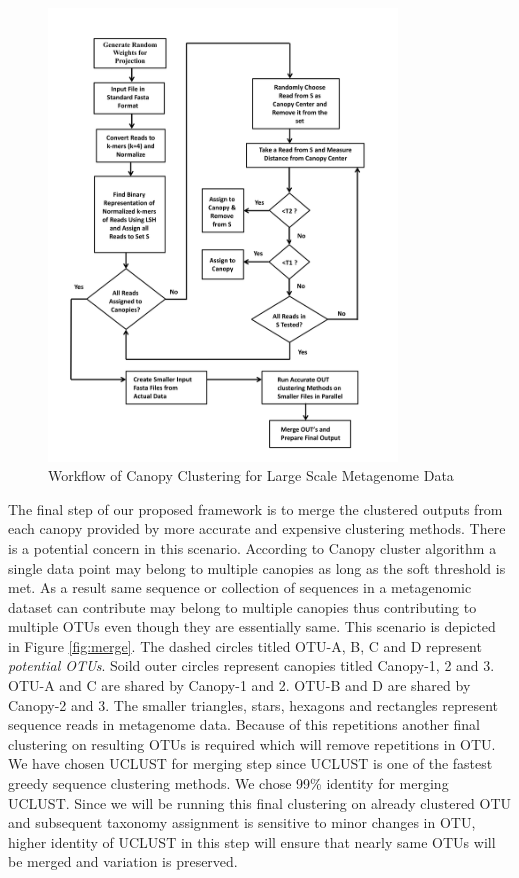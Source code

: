 \documentclass[10pt, conference, compsocconf]{IEEEtran}
\begin{document}
\begin{figure}
	\centering
	\includegraphics[width=\linewidth,height=12cm]{flowchart.png}	
	\caption{Workflow of Canopy Clustering for Large Scale Metagenome Data}
	\label{fig:flowchart}
\end{figure}

The final step of our proposed framework is to merge the clustered outputs from each canopy provided by more accurate and expensive clustering methods. There is a potential concern in this scenario. According to Canopy cluster algorithm a single data point may belong to multiple canopies as long as the soft threshold is met. As a result same sequence or collection of sequences in a metagenomic dataset can contribute may belong to multiple canopies thus contributing to multiple OTUs even though they are essentially same. This scenario is depicted in Figure \ref{fig:merge}. The dashed circles titled OTU-A, B, C and D represent \textit{potential OTUs}. Soild outer circles represent canopies titled Canopy-1, 2 and 3. OTU-A and C are shared by Canopy-1 and 2. OTU-B and D are shared by Canopy-2 and 3. The smaller triangles, stars, hexagons and rectangles represent sequence reads in metagenome data. Because of this repetitions another final clustering on resulting OTUs is required which will remove repetitions in OTU. We have chosen UCLUST for merging step since UCLUST is one of the fastest greedy sequence clustering methods. We chose 99\% identity for merging UCLUST. Since we will be running this final clustering on already clustered OTU and subsequent taxonomy assignment is sensitive to minor changes in OTU, higher identity of UCLUST in this step will ensure that nearly same OTUs will be merged and variation is preserved.
\end{document}
